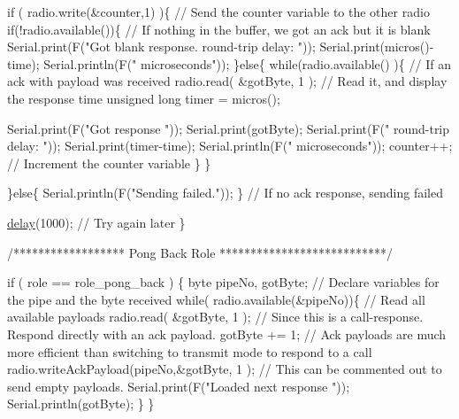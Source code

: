 \begin{DoxyCodeInclude}
    \textcolor{keywordflow}{if} ( radio.write(&counter,1) )\{                         \textcolor{comment}{// Send the counter variable to the other radio
       }
        \textcolor{keywordflow}{if}(!radio.available())\{                             \textcolor{comment}{// If nothing in the buffer, we got an ack but
       it is blank}
            Serial.print(F(\textcolor{stringliteral}{"Got blank response. round-trip delay: "}));
            Serial.print(micros()-time);
            Serial.println(F(\textcolor{stringliteral}{" microseconds"}));     
        \}\textcolor{keywordflow}{else}\{      
            \textcolor{keywordflow}{while}(radio.available() )\{                      \textcolor{comment}{// If an ack with payload was received}
                radio.read( &gotByte, 1 );                  \textcolor{comment}{// Read it, and display the response time}
                \textcolor{keywordtype}{unsigned} \textcolor{keywordtype}{long} timer = micros();
                
                Serial.print(F(\textcolor{stringliteral}{"Got response "}));
                Serial.print(gotByte);
                Serial.print(F(\textcolor{stringliteral}{" round-trip delay: "}));
                Serial.print(timer-time);
                Serial.println(F(\textcolor{stringliteral}{" microseconds"}));
                counter++;                                  \textcolor{comment}{// Increment the counter variable}
            \}
        \}
    
    \}\textcolor{keywordflow}{else}\{        Serial.println(F(\textcolor{stringliteral}{"Sending failed."})); \}          \textcolor{comment}{// If no ack response, sending failed}
    
    \hyperlink{group__Porting__General_ga70a331e8ddf9acf9d33c47b71cda4c5f}{delay}(1000);  \textcolor{comment}{// Try again later}
  \}


\textcolor{comment}{/****************** Pong Back Role ***************************/}

  \textcolor{keywordflow}{if} ( role == role\_pong\_back ) \{
    byte pipeNo, gotByte;                          \textcolor{comment}{// Declare variables for the pipe and the byte received}
    \textcolor{keywordflow}{while}( radio.available(&pipeNo))\{              \textcolor{comment}{// Read all available payloads}
      radio.read( &gotByte, 1 );                   
                                                   \textcolor{comment}{// Since this is a call-response. Respond directly with
       an ack payload.}
      gotByte += 1;                                \textcolor{comment}{// Ack payloads are much more efficient than switching
       to transmit mode to respond to a call}
      radio.writeAckPayload(pipeNo,&gotByte, 1 );  \textcolor{comment}{// This can be commented out to send empty payloads.}
      Serial.print(F(\textcolor{stringliteral}{"Loaded next response "}));
      Serial.println(gotByte);  
   \}
 \}




\end{DoxyCodeInclude}
